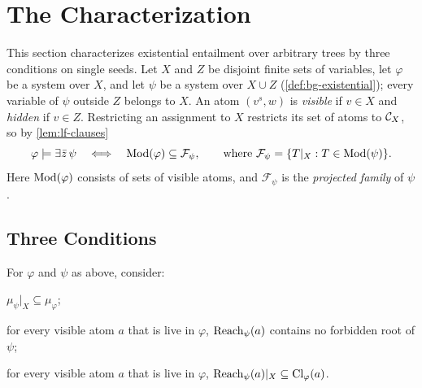 
\section{The Characterization}\label{sec:ch}

This section characterizes existential entailment over arbitrary trees by
three conditions on single seeds. Let $X$ and $Z$ be disjoint finite sets of
variables, let $\varphi$ be a system over $X$, and let $\psi$ be a system
over $X\cup Z$ (\cref{def:bg-existential}); every variable of $\psi$ outside
$Z$ belongs to $X$. An atom $(v^s,w)$ is \emph{visible} if $v\in X$ and
\emph{hidden} if $v\in Z$. Restricting an assignment to $X$ restricts its set
of atoms to $\mathcal C_X$, so by \cref{lem:lf-clauses}
\begin{equation}\label{eq:ch-models}
 \varphi\models\exists\bar z\,\psi\quad\Longleftrightarrow\quad
 \operatorname{Mod}(\varphi)\subseteq\mathcal F_\psi,\qquad\text{where }
 \mathcal F_\psi=\{T|_X:T\in\operatorname{Mod}(\psi)\}.
\end{equation}
Here $\operatorname{Mod}(\varphi)$ consists of sets of visible atoms, and $\mathcal F_\psi$
is the \emph{projected family} of $\psi$.

\subsection{Three Conditions}\label{sec:ch-theorem}

\begin{definition}\label{def:ch-conditions}
For $\varphi$ and $\psi$ as above, consider:
\begin{description}[leftmargin=2.8em,font=\normalfont]
\item[\CondI] $\mu_\psi|_X\subseteq\mu_\varphi$;
\item[\CondU] for every visible atom $a$ that is live in $\varphi$,
  $\operatorname{Reach}_\psi(a)$ contains no forbidden root of $\psi$;
\item[\CondII] for every visible atom $a$ that is live in $\varphi$,
  $\operatorname{Reach}_\psi(a)|_X\subseteq\operatorname{Cl}_\varphi(a)$.
\end{description}
\end{definition}

